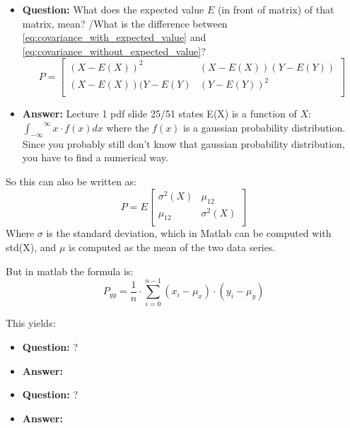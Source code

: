 \begin{itemize}
    \item \textbf{Question:} What does the expected value $E$ (in front of matrix) of that matrix, mean? /What is the difference between \cref{eq:covariance_with_expected_value} and \cref{eq:covariance_without_expected_value}?
    \begin{equation}
P=
\begin{bmatrix}
    {(X-E(X))}^2       & (X-E(X))(Y-E(Y))\\
    (X-E(X))(Y-E(Y)    & {(Y-E(Y))}^2\\
\end{bmatrix}    
\label{eq:covariance_without_expected_value}
\end{equation}
    \item \textbf{Answer:} Lecture 1 pdf slide 25/51 states E(X) is a function of $X$: ${\int_{-\infty}}^{\infty}x\cdot f(x)dx$ where the $f(x)$ is a gaussian probability distribution. Since you probably still don't know that gaussian probability distribution, you have to find a numerical way.
\end{itemize}

So this can also be written as:
\begin{equation}
P=E
\begin{bmatrix}
    {\sigma}^2(X)       & \mu_{12}\\
    \mu_{12}    & {\sigma}^2(X)\\
\end{bmatrix}    
\end{equation}
Where $\sigma$ is the standard deviation, which in Matlab can be computed with std(X), and $\mu$ is computed as the mean of the two data series.

But in matlab the formula is:
\begin{equation}
    P_{yy} = \frac{1}{n}\cdot \sum_{i=0}^{n-1}{(x_i-\mu_x)\cdot (y_i-\mu_y)}
\end{equation}

This yields:
\newpage




\begin{itemize}
    \item \textbf{Question:} ?
    \item \textbf{Answer:}
\end{itemize}



\begin{itemize}
    \item \textbf{Question:} ?
    \item \textbf{Answer:}
\end{itemize}